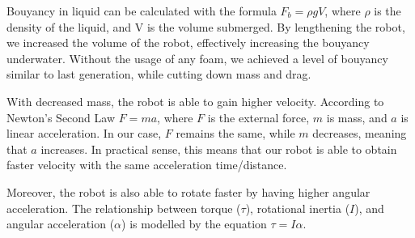 \documentclass[11pt, oneside]{article}   	%
\begin{document}
	Bouyancy in liquid can be calculated with the formula $F_b=\rho g V$, where $\rho$ is the density of the liquid, and V is the volume submerged. By lengthening the robot, we increased the volume of the robot, effectively increasing the bouyancy underwater. Without the usage of any foam, we achieved a level of bouyancy similar to last generation, while cutting down mass and drag.

\begin{center}
\end{center}

	With decreased mass, the robot is able to gain higher velocity. According to Newton's Second Law $F=ma$, where $F$ is the external force, $m$ is mass, and $a$ is linear acceleration. In our case, $F$ remains the same, while $m$ decreases, meaning that $a$ increases. In practical sense, this means that our robot is able to obtain faster velocity with the same acceleration time/distance.

	Moreover, the robot is also able to rotate faster by having higher angular acceleration. The relationship between torque ($\tau$), rotational inertia ($I$), and angular acceleration ($\alpha$) is modelled by the equation $\tau=I \alpha$.
\end{document}
